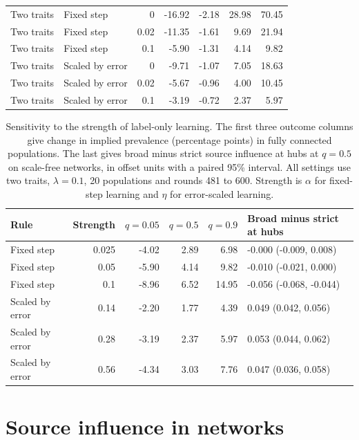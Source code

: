 \begin{table}[htbp]
\begin{tabular}{llrrrrr}
Two traits & Fixed step & 0 & -16.92 & -2.18 & 28.98 & 70.45 \\
Two traits & Fixed step & 0.02 & -11.35 & -1.61 & 9.69 & 21.94 \\
Two traits & Fixed step & 0.1 & -5.90 & -1.31 & 4.14 & 9.82 \\
Two traits & Scaled by error & 0 & -9.71 & -1.07 & 7.05 & 18.63 \\
Two traits & Scaled by error & 0.02 & -5.67 & -0.96 & 4.00 & 10.45 \\
Two traits & Scaled by error & 0.1 & -3.19 & -0.72 & 2.37 & 5.97 \\
\bottomrule
\end{tabular}\endgroup
\end{table}

\begin{table}[htbp]
\centering
\caption{Sensitivity to the strength of label-only learning. The first three outcome columns give change in implied prevalence (percentage points) in fully connected populations. The last gives broad minus strict source influence at hubs at $q=0.5$ on scale-free networks, in offset units with a paired 95\% interval. All settings use two traits, $\lambda=0.1$, 20 populations and rounds 481 to 600. Strength is $\alpha$ for fixed-step learning and $\eta$ for error-scaled learning.}
\label{tab:steps}
\begingroup\small\setlength{\tabcolsep}{4pt}
\begin{tabular}{lrrrrl}
\toprule
Rule & Strength & $q=0.05$ & $q=0.5$ & $q=0.9$ & Broad minus strict at hubs \\
\midrule
Fixed step & 0.025 & -4.02 & 2.89 & 6.98 & -0.000 (-0.009, 0.008) \\
Fixed step & 0.05 & -5.90 & 4.14 & 9.82 & -0.010 (-0.021, 0.000) \\
Fixed step & 0.1 & -8.96 & 6.52 & 14.95 & -0.056 (-0.068, -0.044) \\
Scaled by error & 0.14 & -2.20 & 1.77 & 4.39 & 0.049 (0.042, 0.056) \\
Scaled by error & 0.28 & -3.19 & 2.37 & 5.97 & 0.053 (0.044, 0.062) \\
Scaled by error & 0.56 & -4.34 & 3.03 & 7.76 & 0.047 (0.036, 0.058) \\
\bottomrule
\end{tabular}\endgroup
\end{table}

\FloatBarrier

\section{Source influence in networks}
\label{sec:si_networks}

